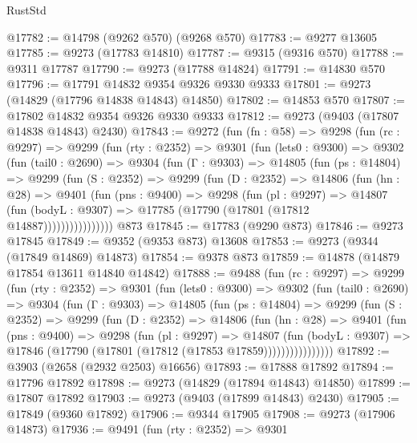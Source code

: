 \begin{lexlean}{RustStd}
\begin{coremodule}
{\begin{coremodule}
{{{{{{{{{{{{{{{{{{{{{{{{{{{{{{{{{{{{{{{{{{{{{{{{{{{{{{{@17782 := @14798 (@9262 @570) (@9268 @570)
@17783 := @9277 @13605
@17785 := @9273 (@17783 @14810)
@17787 := @9315 (@9316 @570)
@17788 := @9311 @17787
@17790 := @9273 (@17788 @14824)
@17791 := @14830 @570
@17796 := @17791 @14832 @9354 @9326 @9330 @9333
@17801 := @9273 (@14829 (@17796 @14838 @14843) @14850)
@17802 := @14853 @570
@17807 := @17802 @14832 @9354 @9326 @9330 @9333
@17812 := @9273 (@9403 (@17807 @14838 @14843) @2430)
@17843 := @9272
    (fun (fn : @58) =>
    @9298
      (fun (rc : @9297) =>
      @9299
        (fun (rty : @2352) =>
        @9301
          (fun (lets0 : @9300) =>
          @9302
            (fun (tail0 : @2690) =>
            @9304
              (fun (Γ : @9303) =>
              @14805
                (fun (ps : @14804) =>
                @9299
                  (fun (S : @2352) =>
                  @9299
                    (fun (D : @2352) =>
                    @14806
                      (fun (hn : @28) =>
                      @9401
                        (fun (pns : @9400) =>
                        @9298
                          (fun (pl : @9297) =>
                          @14807
                            (fun (bodyL : @9307) =>
                            @17785 (@17790 (@17801 (@17812 @14887))))))))))))))))
    @873
@17845 := @17783 (@9290 @873)
@17846 := @9273 @17845
@17849 := @9352 (@9353 @873) @13608
@17853 := @9273 (@9344 (@17849 @14869) @14873)
@17854 := @9378 @873
@17859 := @14878 (@14879 @17854 @13611 @14840 @14842)
@17888 := @9488
    (fun (rc : @9297) =>
    @9299
      (fun (rty : @2352) =>
      @9301
        (fun (lets0 : @9300) =>
        @9302
          (fun (tail0 : @2690) =>
          @9304
            (fun (Γ : @9303) =>
            @14805
              (fun (ps : @14804) =>
              @9299
                (fun (S : @2352) =>
                @9299
                  (fun (D : @2352) =>
                  @14806
                    (fun (hn : @28) =>
                    @9401
                      (fun (pns : @9400) =>
                      @9298
                        (fun (pl : @9297) =>
                        @14807
                          (fun (bodyL : @9307) =>
                          @17846 (@17790 (@17801 (@17812 (@17853 @17859))))))))))))))))
@17892 := @3903 (@2658 (@2932 @2503) @16656)
@17893 := @17888 @17892
@17894 := @17796 @17892
@17898 := @9273 (@14829 (@17894 @14843) @14850)
@17899 := @17807 @17892
@17903 := @9273 (@9403 (@17899 @14843) @2430)
@17905 := @17849 (@9360 @17892)
@17906 := @9344 @17905
@17908 := @9273 (@17906 @14873)
@17936 := @9491
    (fun (rty : @2352) =>
    @9301
}}}}}}}}}}}}}}}}}}}}}}}}}}}}}}}}}}}}}}}}}}}}}}}}}}}}}}}
\end{coremodule}}
\end{coremodule}
\end{lexlean}
